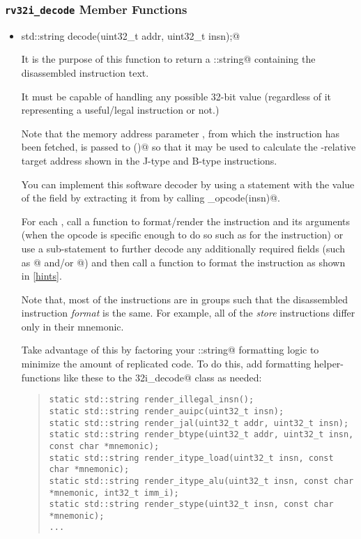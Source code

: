 \documentclass[11pt]{article}
\begin{document}
\subsubsection{{\tt rv32i\_decode} Member Functions}

\begin{itemize}

\item \verb@static std::string decode(uint32_t addr, uint32_t insn);@

It is the purpose of this function to return a \verb@std::string@ containing 
the disassembled instruction text. 

It must be capable of handling any possible 32-bit \verb@insn@ value (regardless of
it representing a useful/legal instruction or not.)

Note that the memory address parameter \verb@addr@, from which the
instruction has been fetched, is passed to \verb@decode()@ so that it 
may be used to calculate the \verb@PC@-relative target address 
shown in the J-type and B-type instructions.

You can implement this software decoder by using a \verb@switch@ statement
with the value of the \verb@opcode@ field by extracting it from \verb@insn@
by calling \verb@get_opcode(insn)@.

For each \verb@case@, call a function to format/render the instruction 
and its arguments (when the opcode is specific enough to do so such as 
for the \verb@lui@ instruction) or use a sub-\verb@switch@ statement to 
further decode any additionally required fields (such as @ 
and/or @) and then call a function to format the instruction 
as shown in \autoref{hints}.


Note that, most of the instructions are in groups such that the disassembled 
instruction {\em format} is the same.  For example, all of the {\em store} 
instructions differ only in their mnemonic.

Take advantage of this by factoring your \verb@std::string@ formatting logic
to minimize the amount of replicated code.  To do this, add formatting 
helper-functions like these to the \verb@rv32i_decode@ class as needed:

\begin{quote}
\small
\begin{verbatim}
static std::string render_illegal_insn();
static std::string render_auipc(uint32_t insn);
static std::string render_jal(uint32_t addr, uint32_t insn);
static std::string render_btype(uint32_t addr, uint32_t insn, const char *mnemonic);
static std::string render_itype_load(uint32_t insn, const char *mnemonic);
static std::string render_itype_alu(uint32_t insn, const char *mnemonic, int32_t imm_i);
static std::string render_stype(uint32_t insn, const char *mnemonic);
...
\end{verbatim}
\end{quote}


\end{itemize}
\end{document}
